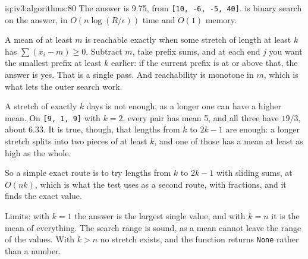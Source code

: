 \begin{solution}{iq:iv3:algorithms:80}
The answer is 9.75, from \texttt{[10, -6, -5, 40]}.  is binary search on the answer, in $O(n \log(R/\epsilon))$ time and $O(1)$ memory.
\label{lst:iv3:al:bestmean}

A mean of at least $m$ is reachable exactly when some stretch of length at least $k$ has $\sum (x_i - m) \ge 0$. Subtract $m$, take prefix sums, and at each end $j$ you want the smallest prefix at least $k$ earlier: if the current prefix is at or above that, the answer is yes. That is a single pass. And reachability is monotone in $m$, which is what lets the outer search work.

A stretch of exactly $k$ days is not enough, as a longer one can have a higher mean. On \texttt{[9, 1, 9]} with $k = 2$, every pair has mean 5, and all three have $19/3$, about 6.33. It is true, though, that lengths from $k$ to $2k - 1$ are enough: a longer stretch splits into two pieces of at least $k$, and one of those has a mean at least as high as the whole.

So a simple exact route is to try lengths from $k$ to $2k - 1$ with sliding sums, at $O(nk)$, which is what the test uses as a second route, with fractions, and it finds the exact value.

Limits: with $k = 1$ the answer is the largest single value, and with $k = n$ it is the mean of everything. The search range is sound, as a mean cannot leave the range of the values. With $k > n$ no stretch exists, and the function returns \texttt{None} rather than a number.

\end{solution}

